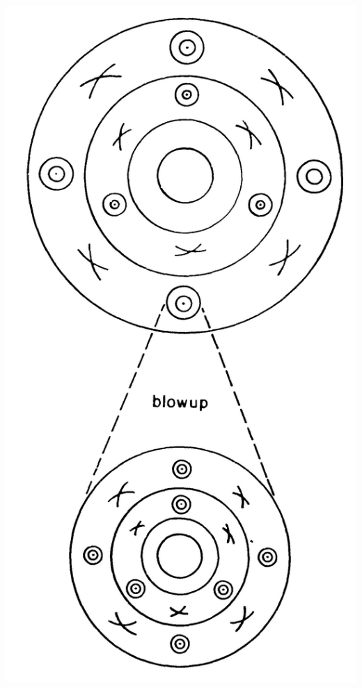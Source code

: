 \documentclass[a4,compress]{beamer}
\theoremstyle{plain}
\theoremstyle{definition}
\begin{document}
\begin{frame}
\begin{itemize}
\begin{columns}[T, onlytextwidth]
\begin{column}{0.4\textwidth}
        \includegraphics[width=.95\textwidth]{self-similar}
      \end{column}
    \end{columns}
  \end{itemize}
\end{frame}

\end{document}
